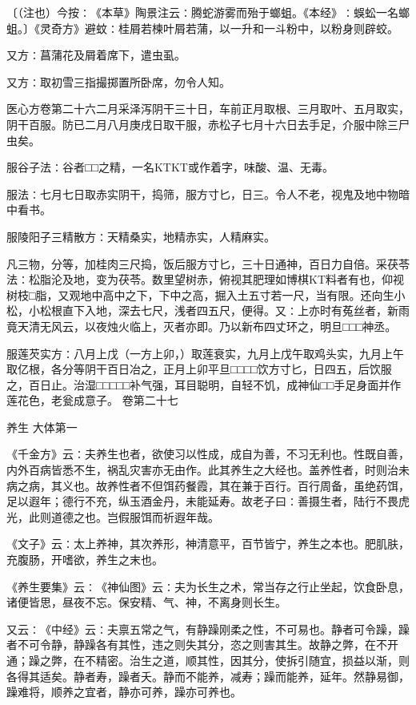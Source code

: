 \documentclass[a4paper,12pt,UTF8,twoside]{ctexbook}
\begin{document}
〔（注也）今按∶《本草》陶景注云∶腾蛇游雾而殆于螂蛆。《本经》∶蜈蚣一名螂蛆。〕《灵奇方》避蚊∶桂屑若楝叶屑若蒲，以一升和一斗粉中，以粉身则辟蛟。

又方∶菖蒲花及屑着席下，遣虫虱。

又方∶取初雪三指撮掷置所卧席，勿令人知。

医心方卷第二十六二月采泽泻阴干三十日，车前正月取根、三月取叶、五月取实，阴干百服。防已二月八月庚戌日取干服，赤松子七月十六日去手足，介服中除三尸虫矣。

服谷子法∶谷者□□之精，一名KTKT或作着字，味酸、温、无毒。

服法∶七月七日取赤实阴干，捣筛，服方寸匕，日三。令人不老，视鬼及地中物暗中看书。

服陵阳子三精散方∶天精桑实，地精赤实，人精麻实。

凡三物，分等，加桂肉三尺捣，饭后服方寸匕，三十日通神，百日力自倍。采茯苓法∶松脂沦及地，变为茯苓。数里望树赤，俯视其肥理如博棋KT料者有也，仰视树枝□脂，又观地中高中之下，下中之高，掘入土五寸若一尺，当有限。还向生小松，小松根直下入地，深去七尺，浅者四五尺，便得。又∶上亦时有菟丝者，新雨竟天清无风云，以夜烛火临上，灭者亦即。乃以新布四丈环之，明旦□□□神丞。

服莲芡实方∶八月上戊（一方上卯，）取莲衰实，九月上戊午取鸡头实，九月上午取亿根，各分等阴干百日冶之，正月上卯平旦□□□□饮方寸匕，日四五，后饮服之，百日止。治湿□□□□□补气强，耳目聪明，自轻不饥，成神仙□□手足身面并作莲花色，老瓮成意子。
卷第二十七

养生
大体第一

《千金方》云∶夫养生也者，欲使习以性成，成自为善，不习无利也。性既自善，内外百病皆悉不生，祸乱灾害亦无由作。此其养生之大经也。盖养性者，时则治未病之病，其义也。故养性者不但饵药餐霞，其在兼于百行。百行周备，虽绝药饵，足以遐年；德行不充，纵玉酒金丹，未能延寿。故老子曰∶善摄生者，陆行不畏虎光，此则道德之也。岂假服饵而祈遐年哉。

《文子》云∶太上养神，其次养形，神清意平，百节皆宁，养生之本也。肥肌肤，充腹肠，开嗜欲，养生之末也。

《养生要集》云∶《神仙图》云∶夫为长生之术，常当存之行止坐起，饮食卧息，诸便皆思，昼夜不忘。保安精、气、神，不离身则长生。

又云∶《中经》云∶夫禀五常之气，有静躁刚柔之性，不可易也。静者可令躁，躁者不可令静，静躁各有其性，违之则失其分，恣之则害其生。故静之弊，在不开通；躁之弊，在不精密。治生之道，顺其性，因其分，使拆引随宜，损益以渐，则各得其适矣。静者寿，躁者夭。静而不能养，减寿；躁而能养，延年。然静易御，躁难将，顺养之宜者，静亦可养，躁亦可养也。
\end{document}
